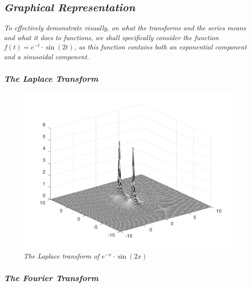 

\subsection{\textit{Graphical Representation}}

	\textit{To effectively demonstrate visually, on what the transforms and the series means and what it does to functions, we shall specifically consider the function $f(t) = e^{-t}\cdot\sin\left(2t\right)$, as this function contains both an exponential component and a sinusoidal component.}

	\subsubsection{\textit{The Laplace Transform}}

		\textit{}

			\begin{figure}[H]
			\centering
			\includegraphics[width=15cm]{LapPictures/bk.png}
    			\caption{\textit{The Laplace transform of $e^{-x}\cdot\sin\left(2x\right)$}}
			\end{figure}

	\subsubsection{\textit{The Fourier Transform}}

		\textit{}

